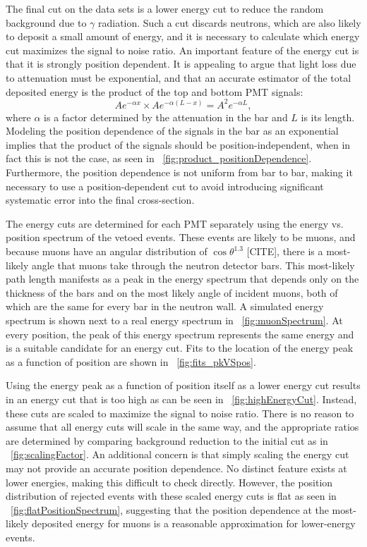 The final cut on the data sets is a lower energy cut to reduce the random background due to $\gamma$ radiation.  Such a cut discards neutrons, which are also likely to deposit a small amount of energy, and it is necessary to calculate which energy cut maximizes the signal to noise ratio.  An important feature of the energy cut is that it is strongly position dependent.  It is appealing to argue that light loss due to attenuation must be exponential, and that an accurate estimator of the total deposited energy is the product of the top and bottom PMT signals:
\begin{equation}
Ae^{-\alpha x}\times Ae^{-\alpha (L-x)} = A^2e^{-\alpha L},
\end{equation}
where $\alpha$ is a factor determined by the attenuation in the bar and $L$ is its length.  Modeling the position dependence of the signals in the bar as an exponential implies that the product of the signals should be position-independent, when in fact this is not the case, as seen in {\fig}~\ref{fig:product_positionDependence}.  Furthermore, the position dependence is not uniform from bar to bar, making it necessary to use a position-dependent cut to avoid introducing significant systematic error into the final cross-section.

The energy cuts are determined for each PMT separately using the energy vs. position spectrum of the vetoed events.  These events are likely to be muons, and because muons have an angular distribution of $\cos{\theta}^{1.3}$ [CITE], there is a most-likely angle that muons take through the neutron detector bars.  This most-likely path length manifests as a peak in the energy spectrum that depends only on the thickness of the bars and on the most likely angle of incident muons, both of which are the same for every bar in the neutron wall.  A simulated energy spectrum is shown next to a real energy spectrum in {\fig}~\ref{fig:muonSpectrum}.  At every position, the peak of this energy spectrum represents the same energy and is a suitable candidate for an energy cut.  Fits to the location of the energy peak as a function of position are shown in {\fig}~\ref{fig:fits_pkVSpos}.

Using the energy peak as a function of position itself as a lower energy cut results in an energy cut that is too high as can be seen in {\fig}~\ref{fig:highEnergyCut}.  Instead, these cuts are scaled to maximize the signal to noise ratio.  There is no reason to assume that all energy cuts will scale in the same way, and the appropriate ratios are determined by comparing background reduction to the initial cut as in {\fig}~\ref{fig:scalingFactor}.  An additional concern is that simply scaling the energy cut may not provide an accurate position dependence.  No distinct feature exists at lower energies, making this difficult to check directly.  However, the position distribution of rejected events with these scaled energy cuts is flat as seen in {\fig}~\ref{fig:flatPositionSpectrum}, suggesting that the position dependence at the most-likely deposited energy for muons is a reasonable approximation for lower-energy events.

